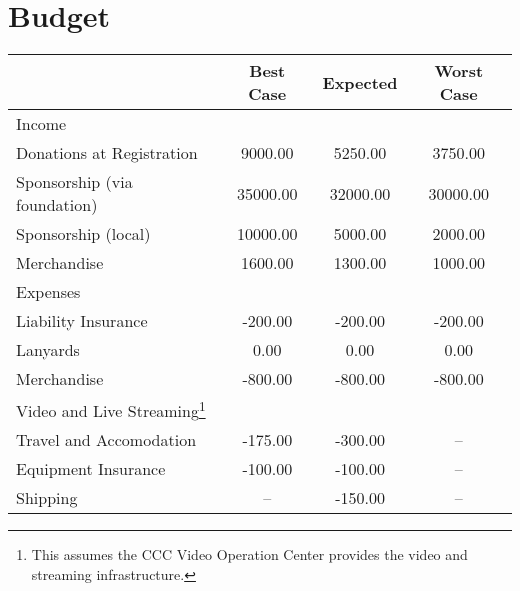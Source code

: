 
\section{Budget}



 
\begin{tabularx}{\linewidth}{XSSS}
   & {Best Case} & {Expected} & {Worst Case} \\
  \hline\hline
Income \hspace*{1em}  & {} & {} & {}\\
\hspace*{1em} Donations at Registration  & 9000.00 & 5250.00 & 3750.00\\
\hspace*{1em} Sponsorship (via foundation)  & 35000.00 & 32000.00 & 30000.00\\
\hspace*{1em} Sponsorship (local)  & 10000.00 & 5000.00 & 2000.00\\
\hspace*{1em} Merchandise  & 1600.00 & 1300.00 & 1000.00\\[0.5ex]
Expenses \hspace*{1em}  & {} & {} & {}\\
\hspace*{1em} Liability Insurance  & -200.00 & -200.00 & -200.00\\
\hspace*{1em} Lanyards  & 0.00 & 0.00 & 0.00\\
\hspace*{1em} Merchandise  & -800.00 & -800.00 & -800.00\\
\hspace*{1em} Video and Live Streaming\footnote{This assumes the CCC Video Operation Center provides the video and streaming infrastructure.}  & {} & {} & {}\\
\hspace*{1em} \hspace*{1em} Travel and Accomodation & -175.00 & -300.00 & {–}\\
\hspace*{1em} \hspace*{1em} Equipment Insurance & -100.00 & -100.00 & {–}\\
\hspace*{1em} \hspace*{1em} Shipping & {–} & -150.00 & {–}\\

\end{tabularx}
